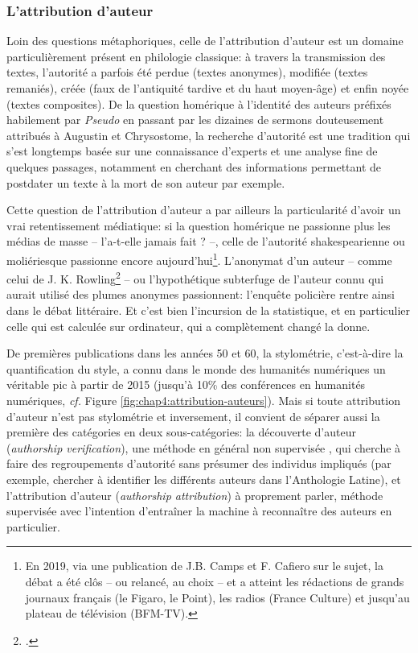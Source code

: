 \subsubsection{L'attribution d'auteur}

Loin des questions métaphoriques, celle de l'attribution d'auteur est un domaine particulièrement présent en philologie classique: à travers la transmission des textes, l'autorité a parfois été perdue (textes anonymes), modifiée (textes remaniés), créée (faux de l'antiquité tardive et du haut moyen-âge) et enfin noyée (textes composites). De la question homérique à l'identité des auteurs préfixés habilement par \textit{Pseudo} en passant par les dizaines de sermons douteusement attribués à Augustin et Chrysostome, la recherche d'autorité est une tradition qui s'est longtemps basée sur une connaissance d'experts et une analyse fine de quelques passages, notamment en cherchant des informations permettant de postdater un texte à la mort de son auteur par exemple. 

Cette question de l'attribution d'auteur a par ailleurs la particularité d'avoir un vrai retentissement médiatique: si la question homérique ne passionne plus les médias de masse -- l'a-t-elle jamais fait ? --, celle de l'autorité shakespearienne ou moliériesque passionne encore aujourd'hui\footnote{En 2019, via une publication de J.B. Camps et F. Cafiero sur le sujet, la débat a été clôs -- ou relancé, au choix -- et a atteint les rédactions de grands journaux français (le Figaro, le Point), les radios (France Culture) et jusqu'au plateau de télévision (BFM-TV).}. L'anonymat d'un auteur -- comme celui de J. K. Rowling\footcite{juola_how_2013} -- ou l'hypothétique subterfuge de l'auteur connu qui aurait utilisé des plumes anonymes passionnent: l'enquête policière rentre ainsi dans le débat littéraire. Et c'est bien l'incursion de la statistique, et en particulier celle qui est calculée sur ordinateur, qui a complètement changé la donne. 

De premières publications dans les années 50 et 60, la stylométrie, c'est-à-dire la quantification du style, a connu dans le monde des humanités numériques un véritable pic à partir de 2015 (jusqu'à 10\% des conférences en humanités numériques, \textit{cf.} Figure \ref{fig:chap4:attribution-auteurs}). Mais si toute attribution d'auteur n'est pas stylométrie et inversement, il convient de séparer aussi la première des catégories en deux sous-catégories: la découverte d'auteur (\textit{authorship verification}), une méthode en général non supervisée , qui cherche à faire des regroupements d'autorité sans présumer des individus impliqués (par exemple, chercher à identifier les différents auteurs dans l'Anthologie Latine), et l'attribution d'auteur (\textit{authorship attribution}) à proprement parler, méthode supervisée avec l'intention d'entraîner la machine à reconnaître des auteurs en particulier.

